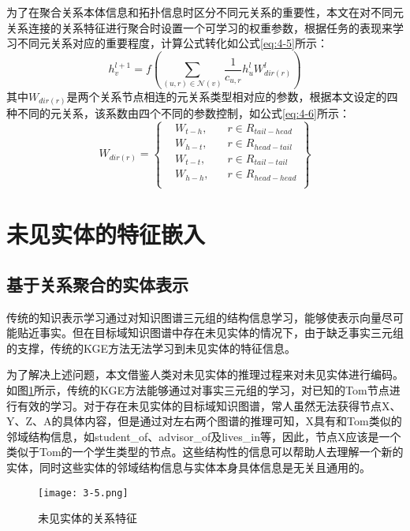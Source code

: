 为了在聚合关系本体信息和拓扑信息时区分不同元关系的重要性，本文在对不同元关系连接的关系特征进行聚合时设置一个可学习的权重参数，根据任务的表现来学习不同元关系对应的重要程度，计算公式转化如公式\ref{eq:4-5}所示：
\begin{equation}
  h_{v}^{l+1} = f\left( \sum_{(u,r) \in \mathcal{N}(v)} \frac{1}{c_{u,r}} h_{u}^{l} W_{ dir(r) }^{l}\right) \label{eq:4-5}
\end{equation}
其中\(W_{dir(r)}\)是两个关系节点相连的元关系类型相对应的参数，根据本文设定的四种不同的元关系，该系数由四个不同的参数控制，如公式\ref{eq:4-6}所示：
\begin{equation}
  W_{dir(r)} = \left\{ \begin{array}{rcl}
    &W_{t-h}  \mbox{,} &\quad r \in R_{tail-head} \\
    &W_{h-t}  \mbox{,} &\quad  r \in R_{head-tail} \\
    &W_{t-t}  \mbox{,} &\quad  r \in R_{tail-tail} \\
    &W_{h-h}  \mbox{,} &\quad  r \in R_{head-head} \\
    \end{array}\right\} \label{eq:4-6}
\end{equation}

\section{未见实体的特征嵌入}
\subsection{基于关系聚合的实体表示}
传统的知识表示学习通过对知识图谱三元组的结构信息学习，能够使表示向量尽可能贴近事实。但在目标域知识图谱中存在未见实体的情况下，由于缺乏事实三元组的支撑，传统的KGE方法无法学习到未见实体的特征信息。

为了解决上述问题，本文借鉴人类对未见实体的推理过程来对未见实体进行编码。如图\ref{fig:3-5}所示，传统的KGE方法能够通过对事实三元组的学习，对已知的Tom节点进行有效的学习。对于存在未见实体的目标域知识图谱，常人虽然无法获得节点X、Y、Z、A的具体内容，但是通过对左右两个图谱的推理可知，X具有和Tom类似的邻域结构信息，如student\_of、advisor\_of及lives\_in等，因此，节点X应该是一个类似于Tom的一个学生类型的节点。这些结构性的信息可以帮助人去理解一个新的实体，同时这些实体的邻域结构信息与实体本身具体信息是无关且通用的。
\begin{figure}[h]
  \centering
  \texttt{[image: 3-5.png]}
  \caption{未见实体的关系特征}
  \label{fig:3-5}
\end{figure}


